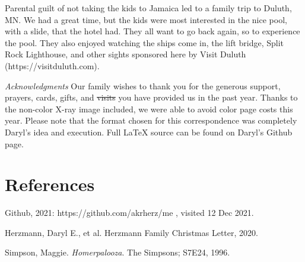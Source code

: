 \documentclass[letterpaper,11pt]{article}
\def\refer{\par\noindent\hangindent\parindent\hangafter1}
\begin{document}
\begin{multicols}{2}
Parental guilt of not taking the kids to Jamaica led to a family trip to Duluth, MN.
We had a great time, but the kids were most interested in the nice pool,
with a slide, that the hotel had.  They all want to go back again,
so to experience the pool.  They also enjoyed watching the ships come in, the
lift bridge, Split Rock Lighthouse, and other sights sponsored here by
Visit Duluth (https://visitduluth.com).

\bigskip

\emph{Acknowledgments} Our family wishes to thank you for the generous 
support, prayers, cards, gifts, and \sout{visits} you have provided us in the past
year. Thanks to the non-color X-ray image included, we were able to avoid color
page costs this year. Please note that the format chosen for this
correspondence was completely Daryl's idea and execution. Full \LaTeX\xspace source can be found on Daryl's Github
page. 

\section{References}

\refer Github, 2021: https://github.com/akrherz/me , visited 12 Dec 2021.
\refer Herzmann, Daryl E., et al. Herzmann Family Christmas Letter, 2020.
\refer Simpson, Maggie. \textit{Homerpalooza}. The Simpsons; S7E24, 1996.

\end{multicols}
\end{document}
